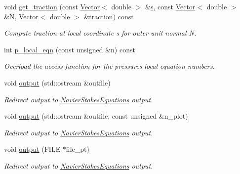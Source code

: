 \begin{DoxyCompactItemize}
void \hyperlink{classoomph_1_1GeneralisedNewtonianAxisymmetricQCrouzeixRaviartElement_a1e70570e27e18c482df95595136876df}{get\+\_\+traction} (const \hyperlink{classoomph_1_1Vector}{Vector}$<$ double $>$ \&\hyperlink{cfortran_8h_ab7123126e4885ef647dd9c6e3807a21c}{s}, const \hyperlink{classoomph_1_1Vector}{Vector}$<$ double $>$ \&N, \hyperlink{classoomph_1_1Vector}{Vector}$<$ double $>$ \&\hyperlink{classoomph_1_1GeneralisedNewtonianAxisymmetricNavierStokesEquations_a8df8becab07205931682772c05d1de1c}{traction}) const
\begin{DoxyCompactList}\small\item\em Compute traction at local coordinate s for outer unit normal N. \end{DoxyCompactList}\item 
int \hyperlink{classoomph_1_1GeneralisedNewtonianAxisymmetricQCrouzeixRaviartElement_a96e455aa73cdc037153ccb6365f6b29c}{p\+\_\+local\+\_\+eqn} (const unsigned \&n) const
\begin{DoxyCompactList}\small\item\em Overload the access function for the pressure\textquotesingle{}s local equation numbers. \end{DoxyCompactList}\item 
void \hyperlink{classoomph_1_1GeneralisedNewtonianAxisymmetricQCrouzeixRaviartElement_ad4ddd436a6bb13b78e25abae6833ed72}{output} (std\+::ostream \&outfile)
\begin{DoxyCompactList}\small\item\em Redirect output to \hyperlink{classoomph_1_1NavierStokesEquations}{Navier\+Stokes\+Equations} output. \end{DoxyCompactList}\item 
void \hyperlink{classoomph_1_1GeneralisedNewtonianAxisymmetricQCrouzeixRaviartElement_a9bf8fddef7384ba0a8966502a137584b}{output} (std\+::ostream \&outfile, const unsigned \&n\+\_\+plot)
\begin{DoxyCompactList}\small\item\em Redirect output to \hyperlink{classoomph_1_1NavierStokesEquations}{Navier\+Stokes\+Equations} output. \end{DoxyCompactList}\item 
void \hyperlink{classoomph_1_1GeneralisedNewtonianAxisymmetricQCrouzeixRaviartElement_aa35348f142e702e3590bc28d5001d492}{output} (F\+I\+LE $\ast$file\+\_\+pt)
\begin{DoxyCompactList}\small\item\em Redirect output to \hyperlink{classoomph_1_1NavierStokesEquations}{Navier\+Stokes\+Equations} output. \end{DoxyCompactList}\item 

\end{DoxyCompactItemize}
